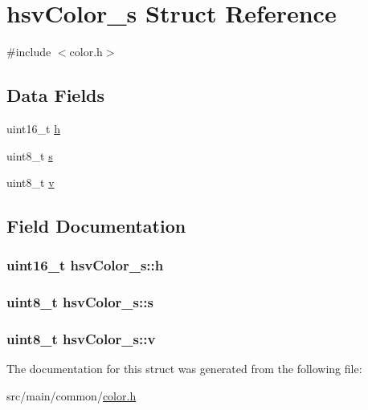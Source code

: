 \hypertarget{structhsvColor__s}{\section{hsv\+Color\+\_\+s Struct Reference}
\label{structhsvColor__s}
}


{\ttfamily \#include $<$color.\+h$>$}

\subsection*{Data Fields}
\begin{DoxyCompactItemize}
\item 
uint16\+\_\+t \hyperlink{structhsvColor__s_a4ebb6ce0cb07f68ca5b48e88a67a1dde}{h}
\item 
uint8\+\_\+t \hyperlink{structhsvColor__s_ad7eb87f1874ea3403822cbe9abdee707}{s}
\item 
uint8\+\_\+t \hyperlink{structhsvColor__s_adb9f876baa0c826ea8b2d09c5a784033}{v}
\end{DoxyCompactItemize}


\subsection{Field Documentation}
\hypertarget{structhsvColor__s_a4ebb6ce0cb07f68ca5b48e88a67a1dde}{
\subsubsection[{h}]{\setlength{\rightskip}{0pt plus 5cm}uint16\+\_\+t hsv\+Color\+\_\+s\+::h}}\label{structhsvColor__s_a4ebb6ce0cb07f68ca5b48e88a67a1dde}
\hypertarget{structhsvColor__s_ad7eb87f1874ea3403822cbe9abdee707}{
\subsubsection[{s}]{\setlength{\rightskip}{0pt plus 5cm}uint8\+\_\+t hsv\+Color\+\_\+s\+::s}}\label{structhsvColor__s_ad7eb87f1874ea3403822cbe9abdee707}
\hypertarget{structhsvColor__s_adb9f876baa0c826ea8b2d09c5a784033}{
\subsubsection[{v}]{\setlength{\rightskip}{0pt plus 5cm}uint8\+\_\+t hsv\+Color\+\_\+s\+::v}}\label{structhsvColor__s_adb9f876baa0c826ea8b2d09c5a784033}


The documentation for this struct was generated from the following file\+:\begin{DoxyCompactItemize}
\item 
src/main/common/\hyperlink{color_8h}{color.\+h}\end{DoxyCompactItemize}
